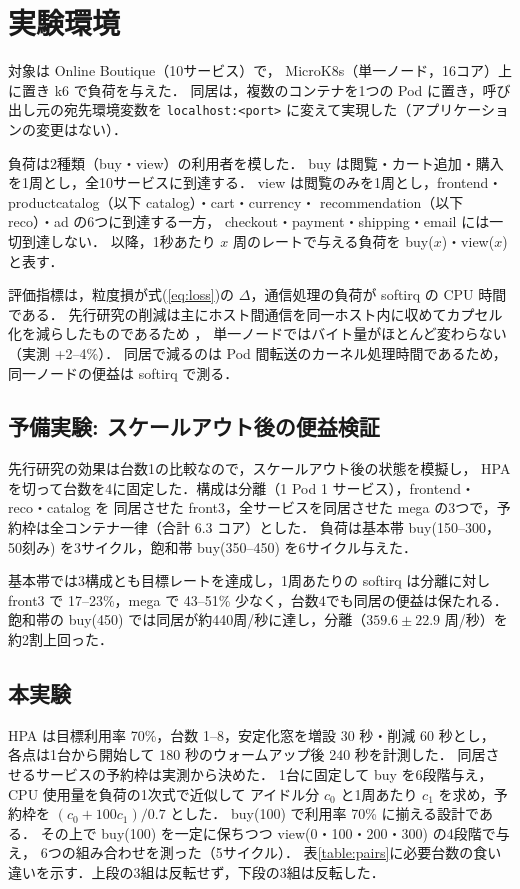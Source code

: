 \documentclass[T,J]{fose}
\begin{document}
\section{実験環境}

対象は Online Boutique\cite{onlineboutique}（10サービス）で，
MicroK8s（単一ノード，16コア）上に置き k6 で負荷を与えた．
同居は，複数のコンテナを1つの Pod に置き，呼び出し元の宛先環境変数を
\texttt{localhost:<port>} に変えて実現した（アプリケーションの変更はない）．

負荷は2種類（buy・view）の利用者を模した．
buy は閲覧・カート追加・購入を1周とし，全10サービスに到達する．
view は閲覧のみを1周とし，frontend・productcatalog（以下 catalog）・cart・currency・
recommendation（以下 reco）・ad の6つに到達する一方，
checkout・payment・shipping・email には一切到達しない．
以降，1秒あたり $x$ 周のレートで与える負荷を buy($x$)・view($x$) と表す．

評価指標は，粒度損が式(\ref{eq:loss})の $\Delta$，通信処理の負荷が softirq の CPU 時間である．
先行研究の削減は主にホスト間通信を同一ホスト内に収めてカプセル化を減らしたものであるため
\cite{wickramanayaka2022}，
単一ノードではバイト量がほとんど変わらない（実測 +2--4\%）．
同居で減るのは Pod 間転送のカーネル処理時間であるため，同一ノードの便益は softirq で測る．


\subsection{予備実験: スケールアウト後の便益検証}

先行研究\cite{wickramanayaka2022}の効果は台数1の比較なので，スケールアウト後の状態を模擬し，
HPA を切って台数を4に固定した．構成は分離（1 Pod 1 サービス），frontend・reco・catalog を
同居させた front3，全サービスを同居させた mega の3つで，予約枠は全コンテナ一律（合計 6.3 コア）とした．
負荷は基本帯 buy(150--300，50刻み) を3サイクル，飽和帯 buy(350--450) を6サイクル与えた．

基本帯では3構成とも目標レートを達成し，1周あたりの softirq は分離に対し
front3 で 17--23\%，mega で 43--51\% 少なく，台数4でも同居の便益は保たれる．
飽和帯の buy(450) では同居が約440周/秒に達し，分離（$359.6 \pm 22.9$ 周/秒）を約2割上回った．


\subsection{本実験}\label{sec:main}

HPA は目標利用率 70\%，台数 1--8，安定化窓を増設 30 秒・削減 60 秒とし，
各点は1台から開始して 180 秒のウォームアップ後 240 秒を計測した．
同居させるサービスの予約枠は実測から決めた．
1台に固定して buy を6段階与え，CPU 使用量を負荷の1次式で近似して
アイドル分 $c_{0}$ と1周あたり $c_{1}$ を求め，予約枠を $(c_{0} + 100 c_{1}) / 0.7$ とした．
buy(100) で利用率 70\% に揃える設計である．
その上で buy(100) を一定に保ちつつ view(0・100・200・300) の4段階で与え，
6つの組み合わせを測った（5サイクル）．
表\ref{table:pairs}に必要台数の食い違いを示す．上段の3組は反転せず，下段の3組は反転した．
\end{document}
